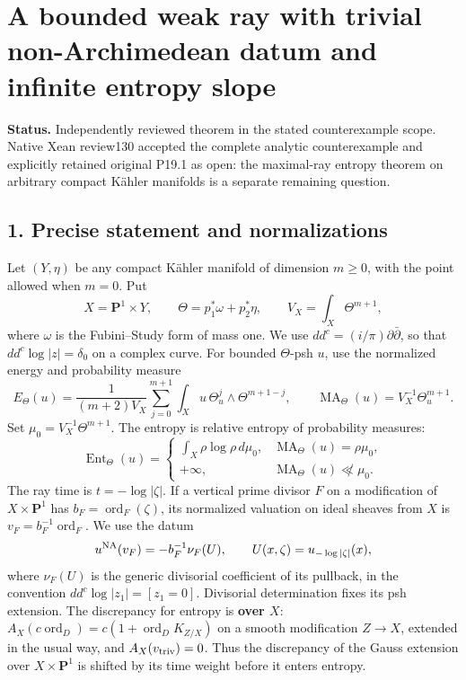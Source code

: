 \documentclass[
]{article}
\author{}
\date{}
\begin{document}
\section{A bounded weak ray with trivial non-Archimedean datum and
infinite entropy
slope}\label{a-bounded-weak-ray-with-trivial-non-archimedean-datum-and-infinite-entropy-slope}

\textbf{Status.} Independently reviewed theorem in the stated
counterexample scope. Native Xean review130 accepted the complete
analytic counterexample and explicitly retained original P19.1 as open:
the maximal-ray entropy theorem on arbitrary compact Kähler manifolds is
a separate remaining question.

\subsection{1. Precise statement and
normalizations}\label{precise-statement-and-normalizations}

Let \((Y,\eta)\) be any compact Kähler manifold of dimension \(m\geq0\),
with the point allowed when \(m=0\). Put \[
 X=\mathbf P^1\times Y,\qquad
 \Theta=p_1^*\omega+p_2^*\eta,\qquad
 V_X=\int_X\Theta^{m+1},
\] where \(\omega\) is the Fubini--Study form of mass one. We use
\(dd^c=(i/\pi)\partial\bar\partial\), so that \(dd^c\log|z|=\delta_0\)
on a complex curve. For bounded \(\Theta\)-psh \(u\), use the normalized
energy and probability measure \[
 E_\Theta(u)=\frac{1}{(m+2)V_X}
 \sum_{j=0}^{m+1}\int_Xu\,\Theta_u^j\wedge\Theta^{m+1-j},
 \qquad \operatorname{MA}_\Theta(u)=V_X^{-1}\Theta_u^{m+1}.
\] Set \(\mu_0=V_X^{-1}\Theta^{m+1}\). The entropy is relative entropy
of probability measures: \[
 \operatorname{Ent}_\Theta(u)=
 \begin{cases}\int_X\rho\log\rho\,d\mu_0,&\operatorname{MA}_\Theta(u)=\rho\mu_0,\\
 +\infty,&\operatorname{MA}_\Theta(u)\not\ll\mu_0.
 \end{cases}
\] The ray time is \(t=-\log|\zeta|\). If a vertical prime divisor \(F\)
on a modification of \(X\times\mathbf P^1\) has
\(b_F=\operatorname{ord}_F(\zeta)\), its normalized valuation on ideal
sheaves from \(X\) is \(v_F=b_F^{-1}\operatorname{ord}_F\). We use the
datum \[
 u^{\rm NA}(v_F)=-b_F^{-1}\nu_F(U),\qquad U(x,\zeta)=u_{-\log|\zeta|}(x),
\] where \(\nu_F(U)\) is the generic divisorial coefficient of its
pullback, in the convention \(dd^c\log|z_1|=[z_1=0]\). Divisorial
determination fixes its psh extension. The discrepancy for entropy is
\textbf{over \(X\)}:
\(A_X(c\operatorname{ord}_D)=c(1+\operatorname{ord}_D K_{Z/X})\) on a
smooth modification \(Z\to X\), extended in the usual way, and
\(A_X(v_{\rm triv})=0\). Thus the discrepancy of the Gauss extension
over \(X\times\mathbf P^1\) is shifted by its time weight before it
enters entropy.
\end{document}
